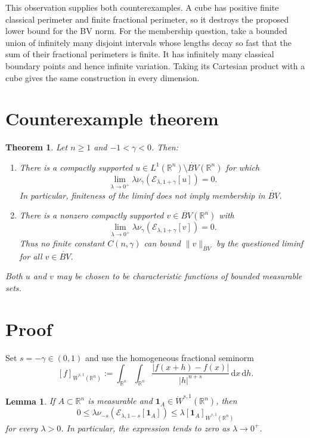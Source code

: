 \documentclass[11pt]{article}
\newcommand{\R}{\mathbb R}
\newcommand{\BV}{\dot{BV}}
\newcommand{\cE}{\mathcal E}
\newcommand{\dif}{\,\mathrm d}
\newtheorem{theorem}{Theorem}
\newtheorem{lemma}{Lemma}
\begin{document}
This observation supplies both counterexamples.  A cube has positive finite
classical perimeter and finite fractional perimeter, so it destroys the
proposed lower bound for the BV norm.  For the membership question, take a
bounded union of infinitely many disjoint intervals whose lengths decay so
fast that the sum of their fractional perimeters is finite.  It has infinitely
many classical boundary points and hence infinite variation.  Taking its
Cartesian product with a cube gives the same construction in every dimension.

\section*{Counterexample theorem}

\begin{theorem}\label{thm:main}
Let $n\geq1$ and $-1<\gamma<0$.  Then:
\begin{enumerate}
\item There is a compactly supported $u\in L^1(\R^n)\setminus\BV(\R^n)$ for
which
\[
  \lim_{\lambda\to0^+}
  \lambda\nu_\gamma(\cE_{\lambda,1+\gamma}[u])=0.
\]
In particular, finiteness of the liminf does not imply membership in $\BV$.
\item There is a nonzero compactly supported $v\in\BV(\R^n)$ with
\[
  \lim_{\lambda\to0^+}
  \lambda\nu_\gamma(\cE_{\lambda,1+\gamma}[v])=0.
\]
Thus no finite constant $C(n,\gamma)$ can bound $\|v\|_{\BV}$ by the
questioned liminf for all $v\in\BV$.
\end{enumerate}
Both $u$ and $v$ may be chosen to be characteristic functions of bounded
measurable sets.
\end{theorem}

\section*{Proof}

Set $s=-\gamma\in(0,1)$ and use the homogeneous fractional seminorm
\[
 [f]_{\dot W^{s,1}(\R^n)}
 :=\int_{\R^n}\int_{\R^n}
 \frac{|f(x+h)-f(x)|}{|h|^{n+s}}\dif x\dif h.
\]

\begin{lemma}\label{lem:vanish}
If $A\subset\R^n$ is measurable and
$\mathbf1_A\in\dot W^{s,1}(\R^n)$, then
\[
  0\leq
  \lambda\nu_{-s}(\cE_{\lambda,1-s}[\mathbf1_A])
  \leq \lambda[\mathbf1_A]_{\dot W^{s,1}(\R^n)}
\]
for every $\lambda>0$.  In particular, the expression tends to zero as
$\lambda\to0^+$.
\end{lemma}
\end{document}
